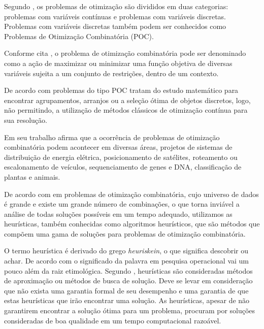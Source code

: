 \documentclass{abntpuc}
\begin{document}
Segundo \cite{steiglitz1982combinatorial}, os problemas de otimização são divididos em duas categorias: problemas com variáveis contínuas e problemas com variáveis discretas. Problemas com variáveis discretas também podem ser conhecidos como Problemas de Otimização Combinatória (POC).\par

Conforme cita \cite{raupp2003introduccao}, o problema de otimização combinatória pode ser denominado como a ação de maximizar ou minimizar uma função objetiva de diversas variáveis sujeita a um conjunto de restrições, dentro de um contexto.\par

De acordo com \cite{opac-b1092847} problemas do tipo POC tratam do estudo matemático para encontrar agrupamentos, arranjos ou a seleção ótima de objetos discretos, logo, não permitindo, a utilização de métodos clássicos de otimização contínua para sua resolução.\par


Em seu trabalho \cite{golbarg2000otimizaccao} afirma que a ocorrência de problemas de otimização combinatória podem acontecer em diversas áreas, projetos de sistemas de distribuição de energia elétrica, posicionamento de satélites, roteamento ou escalonamento de veículos, sequenciamento de genes e DNA, classificação de plantas e animais.\par

De acordo com \cite{deleonardo} em problemas de otimização combinatória, cujo universo de dados é grande e existe um grande número de combinações, o que torna inviável a análise de todas soluções possíveis em um tempo adequado, utilizamos as heurísticas, também conhecidas como algoritmos heurísticos, que são métodos que compõem uma gama de soluções para problemas de otimização combinatória.


O termo heurística é derivado do grego \textit{heuriskein}, o que significa descobrir ou achar. De acordo com \cite{timoteo2005desenvolvimento} o significado da palavra em pesquisa operacional vai um pouco além da raiz etimológica. Segundo \cite{steiglitz1982combinatorial}, heurísticas são consideradas métodos de aproximação ou métodos de busca de solução. Deve se levar em consideração que não exista uma garantia formal de seu desempenho e uma garantia de que estas heurísticas que irão encontrar uma solução. As heurísticas, apesar de não garantirem encontrar a solução ótima para um problema, procuram por soluções consideradas de boa qualidade em um tempo computacional razoável.\par
\end{document}
